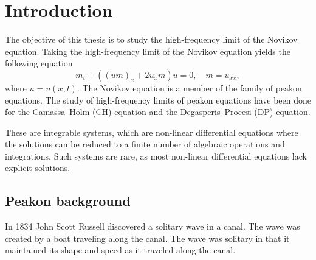 \documentclass[english,master]{liumaiex}
\theoremstyle{plain}
\theoremstyle{definition}
\begin{document}




\tableofcontents

\newpage



%
%

\section{Introduction}

The objective of this thesis is to study the high-frequency limit of the Novikov equation. Taking the high-frequency limit of the Novikov equation yields the following equation
\begin{equation} \label{eq:Novikov_high_freq}
	m_t + ((um)_x + 2u_xm) u = 0,\quad m = u_{xx},
\end{equation}
where $u = u(x, t)$. The Novikov equation is a member of the family of peakon equations. The study of high-frequency limits of peakon equations have been done for the Camassa--Holm (CH) equation and the Degasperis--Procesi (DP) equation.

These are integrable systems, which are non-linear differential equations where the solutions can be reduced to a finite number of algebraic operations and integrations. Such systems are rare, as most non-linear differential equations lack explicit solutions.

\subsection{Peakon background}

In 1834 John Scott Russell discovered a solitary wave in a canal. The wave was created by a boat traveling along the canal. The wave was solitary in that it maintained its shape and speed as it traveled along the canal.
\end{document}
